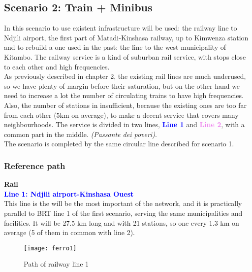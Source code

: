 \documentclass{article}
\begin{document}
\subsection{Scenario 2: Train + Minibus}
In this scenario to use existent infrastructure will be used: the railway line to Ndjili airport, the first part of Matadi-Kinshasa railway, up to Kimwenza station and to rebuild a one used in the past: the line to the west municipality of Kitambo.  
The railway service is a kind of suburban rail service, with stops close to each other and high frequencies.\\
As previously described in chapter 2, the existing rail lines are much underused, so we have plenty of margin before their saturation, but on the other hand we need to increase a lot the number of circulating trains to have high frequencies. Also, the number of stations in insufficient, because the existing ones are too far from each other (5km on average), to make a decent service that covers many neighbourhoods.  
The service is divided in two lines, \textbf{\textcolor{blue}{Line 1}} and \textbf{\textcolor{violet}{Line 2}}, with a common part in the middle. \textit{(Passante dei poveri)}.\\
The scenario is completed by the same circular line described for scenario 1.
 \subsubsection{Reference path}
 \textbf{Rail}\\
 \textbf{\textcolor{blue}{Line 1: Ndjili airport-Kinshasa Ouest}}\\
This line is the will be the most important of the network, and it is practically parallel to BRT line 1 of the first scenario, serving the same municipalities and facilities. It will be 27.5 km long and with 21 stations, so one every 1.3 km on average (5 of them in common with line 2).\\
\begin{figure}[H]
\centering
\texttt{[image: ferro1]}
\caption{Path of railway line 1}
\end{figure} 
\end{document}
